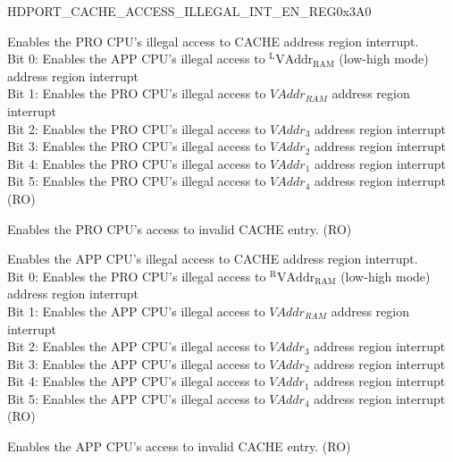 \begin{register}{H}{DPORT\_CACHE\_ACCESS\_ILLEGAL\_INT\_EN\_REG}{0x3A0}\label{regdesc:DPORTCACHEACCESSILLEGALINTENREG}
%
%
%
%
%
%
%
\regnewline%
\begin{regdesc}\begin{reglist}
\item [DPORT\_PRO\_CACHE\_ACCESS\_ILLEGAL\_INT\_EN] Enables the PRO CPU's illegal access to CACHE address region interrupt.\\
Bit 0: Enables the APP CPU's illegal access to $^{\mathrm{L}}\mathrm{VAddr}_{\mathrm{RAM}}$ (low-high mode) address region interrupt\\
Bit 1: Enables the PRO CPU's illegal access to ${VAddr}_{RAM}$ address region interrupt\\
Bit 2: Enables the PRO CPU's illegal access to $VAddr_3$ address region interrupt\\
Bit 3: Enables the PRO CPU's illegal access to $VAddr_2$ address region interrupt\\
Bit 4: Enables the PRO CPU's illegal access to $VAddr_1$ address region interrupt\\
Bit 5: Enables the PRO CPU's illegal access to $VAddr_4$ address region interrupt\\
(RO)
\item [DPORT\_PRO\_CACHE\_MMU\_ILLEGAL\_INT\_EN] Enables the PRO CPU's access to invalid CACHE entry. (RO)
\item [DPORT\_APP\_CACHE\_ACCESS\_ILLEGAL\_INT\_EN] Enables the APP CPU's illegal access to CACHE address region interrupt.\\
Bit 0: Enables the PRO CPU's illegal access to $^{\mathrm{R}}\mathrm{VAddr}_{\mathrm{RAM}}$ (low-high mode) address region interrupt\\
Bit 1: Enables the APP CPU's illegal access to ${VAddr}_{RAM}$ address region interrupt\\
Bit 2: Enables the APP CPU's illegal access to $VAddr_3$ address region interrupt\\
Bit 3: Enables the APP CPU's illegal access to $VAddr_2$ address region interrupt\\
Bit 4: Enables the APP CPU's illegal access to $VAddr_1$ address region interrupt\\
Bit 5: Enables the APP CPU's illegal access to $VAddr_4$ address region interrupt\\
(RO)
\item [DPORT\_APP\_CACHE\_MMU\_ILLEGAL\_INT\_EN] Enables the APP CPU's access to invalid CACHE entry. (RO)
\end{reglist}\end{regdesc}
\end{register}

